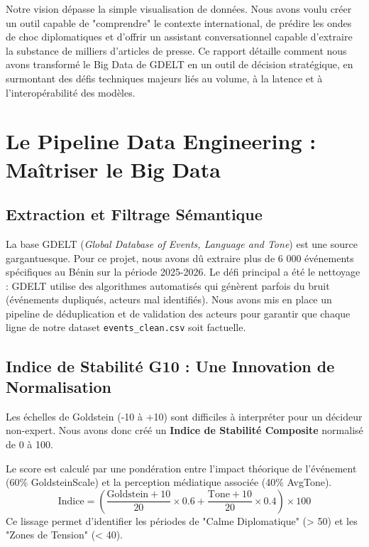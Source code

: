 \documentclass[12pt,a4paper]{article}
\begin{document}
Notre vision dépasse la simple visualisation de données. Nous avons voulu créer un outil capable de "comprendre" le contexte international, de prédire les ondes de choc diplomatiques et d'offrir un assistant conversationnel capable d'extraire la substance de milliers d'articles de presse. Ce rapport détaille comment nous avons transformé le Big Data de GDELT en un outil de décision stratégique, en surmontant des défis techniques majeurs liés au volume, à la latence et à l'interopérabilité des modèles.

\section{Le Pipeline Data Engineering : Maîtriser le Big Data}
\subsection{Extraction et Filtrage Sémantique}
La base GDELT (\textit{Global Database of Events, Language and Tone}) est une source gargantuesque. Pour ce projet, nous avons dû extraire plus de 6 000 événements spécifiques au Bénin sur la période 2025-2026. Le défi principal a été le nettoyage : GDELT utilise des algorithmes automatisés qui génèrent parfois du bruit (événements dupliqués, acteurs mal identifiés). Nous avons mis en place un pipeline de déduplication et de validation des acteurs pour garantir que chaque ligne de notre dataset \texttt{events\_clean.csv} soit factuelle.

\subsection{Indice de Stabilité G10 : Une Innovation de Normalisation}
Les échelles de Goldstein (-10 à +10) sont difficiles à interpréter pour un décideur non-expert. Nous avons donc créé un \textbf{Indice de Stabilité Composite} normalisé de 0 à 100.
\begin{tcolorbox}[colback=softgrey, colframe=beningreen, title=Logique Algorithmique]
    Le score est calculé par une pondération entre l'impact théorique de l'événement (60\% GoldsteinScale) et la perception médiatique associée (40\% AvgTone). 
    \[ \text{Indice} = \left( \frac{\text{Goldstein} + 10}{20} \times 0.6 + \frac{\text{Tone} + 10}{20} \times 0.4 \right) \times 100 \]
    Ce lissage permet d'identifier les périodes de "Calme Diplomatique" (> 50) et les "Zones de Tension" (< 40).
\end{tcolorbox}
\end{document}
